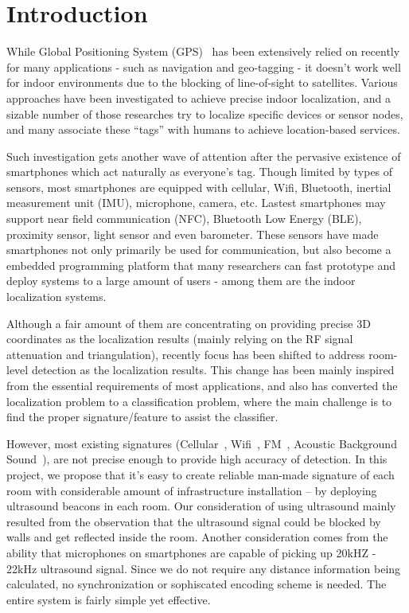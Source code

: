 \section{Introduction}
\label{sec:introduction}

While Global Positioning System (GPS)~\cite{hofmann1993global} has been extensively relied on recently for many applications - such as navigation and geo-tagging - it doesn't work well for indoor environments due to the blocking of line-of-sight to satellites. Various approaches have been investigated to achieve precise indoor localization, and a sizable number of those researches try to localize specific devices or sensor nodes, and many associate these ``tags'' with humans to achieve location-based services. 

Such investigation gets another wave of attention after the pervasive existence of smartphones which act naturally as everyone's tag. Though limited by types of sensors, most smartphones are equipped with cellular, Wifi, Bluetooth, inertial measurement unit (IMU), microphone, camera, etc. Lastest smartphones may support near field communication (NFC), Bluetooth Low Energy (BLE), proximity sensor, light sensor and even barometer. These sensors have made smartphones not only primarily be used for communication, but also become a embedded programming platform that many researchers can fast prototype and deploy systems to a large amount of users - among them are the indoor localization systems.

Although a fair amount of them are concentrating on providing precise 3D coordinates as the localization results (mainly relying on the RF signal attenuation and triangulation), recently focus has been shifted to address room-level detection as the localization results. This change has been mainly inspired from the essential requirements of most applications, and also has converted the localization problem to a classification problem, where the main challenge is to find the proper signature/feature to assist the classifier.

However, most existing signatures (Cellular~\cite{otsason2005accurate}, Wifi~\cite{cheng2005accuracy}, FM~\cite{chen2012fm}, Acoustic Background Sound~\cite{tarzia2011indoor}), are not precise enough to provide high accuracy of detection. In this project, we propose that it's easy to create reliable man-made signature of each room with considerable amount of infrastructure installation -- by deploying ultrasound beacons in each room. Our consideration of using ultrasound mainly resulted from the observation that the ultrasound signal could be blocked by walls and get reflected inside the room. Another consideration comes from the ability that microphones on smartphones are capable of picking up 20kHZ - 22kHz ultrasound signal. Since we do not require any distance information being calculated, no synchronization or sophiscated encoding scheme is needed. The entire system is fairly simple yet effective.

